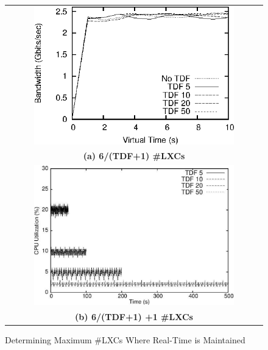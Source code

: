 \begin{figure} \centering
 \begin{tabular}{c} 
      \includegraphics[width=0.8\textwidth]{images/core_iperf.eps} \\ 
      {\textbf{(a) 6/(TDF+1) \#LXCs}}\label{subfig-1:core_iperf} \\ 
      \includegraphics[width=0.8\textwidth]{images/core_cpu.eps} \\ 
      {\textbf{(b) 6/(TDF+1) +1 \#LXCs}}\label{subfig-2:core_cpu} 
  \end{tabular} 
    \caption{Determining Maximum \#LXCs Where Real-Time is Maintained} 
    \label{fig:core_exp} 
  \end{figure} 
